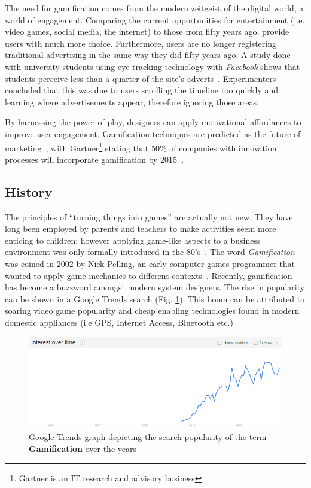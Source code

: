 The need for gamification comes from the modern zeitgeist of the digital world, a world of engagement. Comparing the current opportunities for entertainment (i.e. video games, social media, the internet) to those from fifty years ago, provide users with much more choice. Furthermore, users are no longer registering traditional advertising in the same way they did fifty years ago. A study done with university students using eye-tracking technology with \emph{Facebook} shows that students perceive less than a quarter of the site's adverts~\cite{barreto2013users}. Experimenters concluded that this was due to users scrolling the timeline too quickly and learning where advertisements appear, therefore ignoring those areas. 

By harnessing the power of play, designers can apply motivational affordances to improve user engagement. Gamification techniques are predicted as the future of marketing~\cite{ventata}, with Gartner\footnote{Gartner is an IT research and advisory business} stating that 50\% of companies with innovation processes will incorporate gamification by 2015~\cite{gartner50}.

\subsection{History}
The principles of ``turning things into games'' are actually not new. They have long been employed by parents and teachers to make activities seem more enticing to children; however applying game-like aspects to a business environment was only formally introduced in the 80's~\cite{coonradt1985game}. The word \emph{Gamification} was coined in 2002 by Nick Pelling, an early computer games programmer that wanted to apply game-mechanics to different contexts~\cite{marczewskigamification}. Recently, gamification has become a buzzword amongst modern system designers. The rise in popularity can be shown in a Google Trends search (Fig. \ref{fig:gamificationpopularity}). This boom can be attributed to soaring video game popularity and cheap enabling technologies found in modern domestic appliances (i.e GPS, Internet Access, Bluetooth etc.)~\cite{Deterding:2012:GDM:2212877.2212883}

\begin{figure}[H]
  \centering
    \includegraphics[width=1\textwidth]{img/gamification.png}
      \caption{Google Trends graph depicting the search popularity of the term \textbf{Gamification} over the years}
      \label{fig:gamificationpopularity}
\end{figure}


